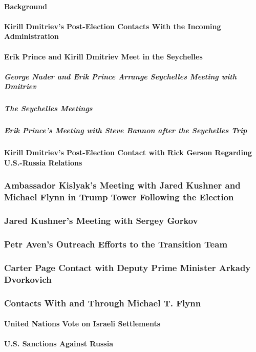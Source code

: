 \paragraph{Background}

\paragraph{Kirill Dmitriev's Post-Election Contacts With the Incoming Administration}

\paragraph{Erik Prince and Kirill Dmitriev Meet in the Seychelles}

\subparagraph{George Nader and Erik Prince Arrange Seychelles Meeting with Dmitriev}

\subparagraph{The Seychelles Meetings}

\subparagraph{Erik Prince's Meeting with Steve Bannon after the Seychelles Trip}

\paragraph{Kirill Dmitriev's Post-Election Contact with Rick Gerson Regarding U.S.-Russia Relations}

\subsubsection{Ambassador Kislyak's Meeting with Jared Kushner and Michael Flynn in Trump Tower Following the Election}

\subsubsection{Jared Kushner's Meeting with Sergey Gorkov}

\subsubsection{Petr Aven's Outreach Efforts to the Transition Team}

\subsubsection{Carter Page Contact with Deputy Prime Minister Arkady Dvorkovich}

\subsubsection{Contacts With and Through Michael T. Flynn}

\paragraph{United Nations Vote on Israeli Settlements}

\paragraph{U.S. Sanctions Against Russia}
